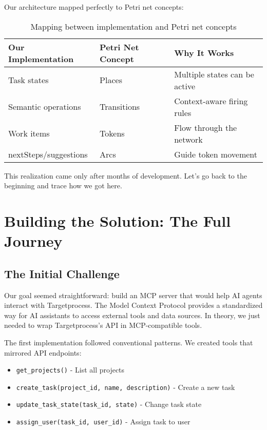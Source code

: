 \documentclass[11pt,a4paper]{article}
\begin{document}
Our architecture mapped perfectly to Petri net concepts:

\begin{table}[H]
\centering
\begin{tabular}{|l|l|l|}
\hline
\textbf{Our Implementation} & \textbf{Petri Net Concept} & \textbf{Why It Works} \\
\hline
Task states & Places & Multiple states can be active \\
Semantic operations & Transitions & Context-aware firing rules \\
Work items & Tokens & Flow through the network \\
nextSteps/suggestions & Arcs & Guide token movement \\
\hline
\end{tabular}
\caption{Mapping between implementation and Petri net concepts}
\end{table}

This realization came only after months of development. Let's go back to the beginning and trace how we got here.

\section{Building the Solution: The Full Journey}

\subsection{The Initial Challenge}

Our goal seemed straightforward: build an MCP server that would help AI agents interact with Targetprocess. The Model Context Protocol provides a standardized way for AI assistants to access external tools and data sources. In theory, we just needed to wrap Targetprocess's API in MCP-compatible tools.

The first implementation followed conventional patterns. We created tools that mirrored API endpoints:
\begin{itemize}
\item \texttt{get\_projects()} - List all projects
\item \texttt{create\_task(project\_id, name, description)} - Create a new task
\item \texttt{update\_task\_state(task\_id, state)} - Change task state
\item \texttt{assign\_user(task\_id, user\_id)} - Assign task to user
\end{itemize}
\end{document}
